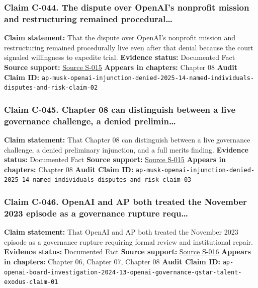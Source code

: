 \documentclass[
  american,
  11pt,
  letterpaper,
]{article}
\begin{document}
\subsubsection{Claim C-044. The dispute over OpenAI's nonprofit mission
and restructuring remained
procedural\ldots{}}\label{claim-c-044-the-dispute-over-openai-s-nonprofit-mission-and-restructuring-remained-procedural}

\textbf{Claim statement:} That the dispute over OpenAI's nonprofit
mission and restructuring remained procedurally live even after that
denial because the court signaled willingness to expedite trial.
\textbf{Evidence status:} Documented Fact \textbf{Source support:}
\hyperref[source-s-015-judge-denies-elon-musk-s-request-to-block-openai-for-profit-conversion-but-welcomes-trial]{Source
S-015} \textbf{Appears in chapters:} Chapter 08 \textbf{Audit Claim ID:}
\texttt{ap-musk-openai-injunction-denied-2025-14-named-individuals-disputes-and-risk-claim-02}

\subsubsection{Claim C-045. Chapter 08 can distinguish between a live
governance challenge, a denied
prelimin\ldots{}}\label{claim-c-045-chapter-08-can-distinguish-between-a-live-governance-challenge-a-denied-prelimin}

\textbf{Claim statement:} That Chapter 08 can distinguish between a live
governance challenge, a denied preliminary injunction, and a full merits
finding. \textbf{Evidence status:} Documented Fact \textbf{Source
support:}
\hyperref[source-s-015-judge-denies-elon-musk-s-request-to-block-openai-for-profit-conversion-but-welcomes-trial]{Source
S-015} \textbf{Appears in chapters:} Chapter 08 \textbf{Audit Claim ID:}
\texttt{ap-musk-openai-injunction-denied-2025-14-named-individuals-disputes-and-risk-claim-03}

\subsubsection{Claim C-046. OpenAI and AP both treated the November 2023
episode as a governance rupture
requ\ldots{}}\label{claim-c-046-openai-and-ap-both-treated-the-november-2023-episode-as-a-governance-rupture-requ}

\textbf{Claim statement:} That OpenAI and AP both treated the November
2023 episode as a governance rupture requiring formal review and
institutional repair. \textbf{Evidence status:} Documented Fact
\textbf{Source support:}
\hyperref[source-s-016-openai-has-full-confidence-in-ceo-sam-altman-after-investigation-reinstates-him-to-board]{Source
S-016} \textbf{Appears in chapters:} Chapter 06, Chapter 07, Chapter 08
\textbf{Audit Claim ID:}
\texttt{ap-openai-board-investigation-2024-13-openai-governance-qstar-talent-exodus-claim-01}
\end{document}
